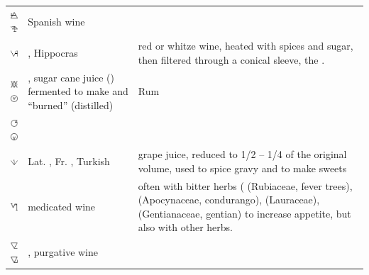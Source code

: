 \documentclass[british,final,landscape]{scrartcl}
\begin{document}
\begin{refsection}
\begin{supertabular}{p{0.3\textwidth}p{0.34\textwidth}p{0.34\textwidth}}
   \includegraphics[width=5mm]{Mixtures/SpanishWine} \includegraphics[width=5mm]{Mixtures/SpanishWine2} & Spanish wine & \\
   \includegraphics[width=5mm]{Mixtures/Hippocras} & , Hippocras & red or whitze wine, heated with spices and sugar, then filtered through a conical sleeve, the .  \\
   \includegraphics[width=5mm]{Mixtures/VinumAdustum} \includegraphics[width=5mm]{Mixtures/VinumAdustum2} & , sugar cane juice () fermented to make  and ``burned'' (distilled) & Rum \\
   \includegraphics[width=5mm]{Mixtures/VinumCirculatum} \includegraphics[width=5mm]{Mixtures/VinumCirculatum2} &  & \\
   \includegraphics[width=5mm]{Mixtures/VinumCoctum} & Lat. , Fr. , Turkish  & grape juice, reduced to 1/2 -- 1/4 of the original volume, used to spice gravy and to make sweets\\
   \includegraphics[width=5mm]{Mixtures/MedicatedWine} &  medicated wine & often with bitter herbs ( (Rubiaceae, fever trees),  (Apocynaceae, condurango),  (Lauraceae),  (Gentianaceae, gentian) to increase appetite, but also with other herbs.  \\
   \includegraphics[width=5mm]{Mixtures/VinumLaxativum} \includegraphics[width=5mm]{Mixtures/PurgativeWine} & , purgative wine & \\
  \end{supertabular}


\end{refsection}
\end{document}
